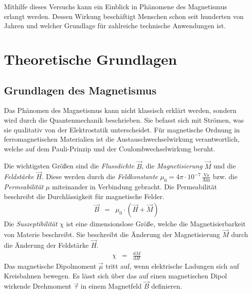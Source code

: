\documentclass[12pt,a4paper]{scrartcl}
\numberwithin{equation}{section} %
\begin{document}
Mithilfe dieses Versuchs kann ein Einblick in Phänomene des Magnetismus erlangt werden. Dessen Wirkung beschäftigt Menschen schon seit hunderten von Jahren und welcher Grundlage für zahlreiche technische Anwendungen ist.

\clearpage
\hypertarget{theoretische-grundlagen}{%
\section{Theoretische Grundlagen}\label{theoretische-grundlagen}}

\hypertarget{grundlagen-des-magnetismus}{%
\subsection{Grundlagen des Magnetismus}\label{grundlagen-des-magnetismus}}
Das Phänomen des Magnetismus kann nicht klassisch erklärt werden, sondern wird durch die Quantenmechanik beschrieben. Sie befasst sich mit Strömen, was sie qualitativ von der Elektrostatik unterscheidet. Für magnetische Ordnung in ferromagnetischen Materialien ist die
Austauschwechselwirkung verantwortlich, welche auf dem Pauli-Prinzip und der Coulombwechselwirkung beruht.

Die wichtigsten Größen sind die \emph{Flussdichte} $\vec B$, die \emph{Magnetisierung} $\vec M$ und die \emph{Feldstärke} $\vec H$. Diese werden durch die \emph{Feldkonstante}
$\mu_0=4\pi\cdot 10^{-7}\mathrm{\,\frac{Vs}{Am}}$ bzw. die \emph{Permeabilität} $\mu$ miteinander in Verbindung gebracht. Die Permeabilität beschreibt die Durchlässigkeit für magnetische Felder. \cite{Jackson}
\begin{eqnarray}
    \vec B &=& \mu_0 \cdot \left(\vec H + \vec M\right) \label{M1}
\end{eqnarray}
Die \emph{Suszeptibilität} $\chi$ ist eine dimensionslose Größe, welche die Magnetisierbarkeit von Materie beschreibt. Sie beschreibt die Änderung der Magnetisierung $\vec M$ durch die Änderung der Feldstärke $\vec H$.
\begin{eqnarray}
    \chi &=& \frac{\mathrm dM}{\mathrm dH} \label{Chi}
\end{eqnarray}
Das magnetische Dipolmoment $\vec \mu$ tritt auf, wenn elektrische Ladungen sich auf Kreisbahnen bewegen. Es lässt sich über das auf einen magnetischen Dipol wirkende Drehmoment $\vec \tau$ in einem Magnetfeld $\vec B$ definieren.
\end{document}
